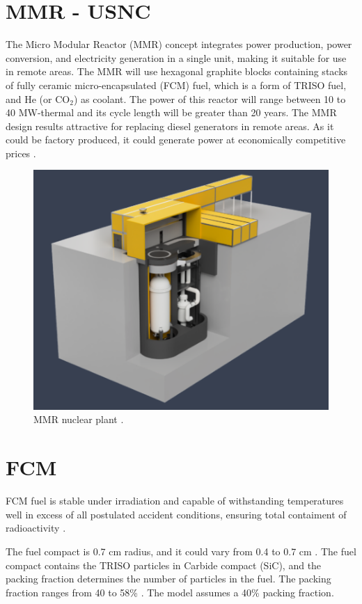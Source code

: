 \section{MMR - USNC}

The Micro Modular Reactor (MMR) concept integrates power production, power conversion, and electricity generation in a single unit, making it suitable for use in remote areas. 
The MMR will use hexagonal graphite blocks containing stacks of fully ceramic micro-encapsulated (FCM) fuel, which is a form of TRISO fuel, and He (or CO$_2$) as coolant.
The power of this reactor will range between 10 to 40 MW-thermal and its cycle length will be greater than 20 years.
The MMR design results attractive for replacing diesel generators in remote areas. As it could be factory produced, it could generate power at economically competitive prices \cite{hawari_development_2018}.

\begin{figure}[H]
	\centering
	\includegraphics[width=0.5\linewidth]{figures/mmr.png}
	\hfill
	\caption{MMR nuclear plant \cite{usnc_mmr_2019}.}
	\label{fig:triso}
\end{figure}

\section{FCM}

FCM fuel is stable under irradiation and capable of withstanding temperatures well in excess of all postulated accident conditions, ensuring total contaiment of radioactivity \cite{usnc_mmr_2019}.

The fuel compact is 0.7 cm radius, and it could vary from 0.4 to 0.7 cm \cite{powers_fully_2013}. The fuel compact contains the TRISO particles in Carbide compact (SiC), and the packing fraction determines the number of particles in the fuel. The packing fraction ranges from 40 to 58\% \cite{powers_fully_2013}. The model assumes a 40\% packing fraction.

